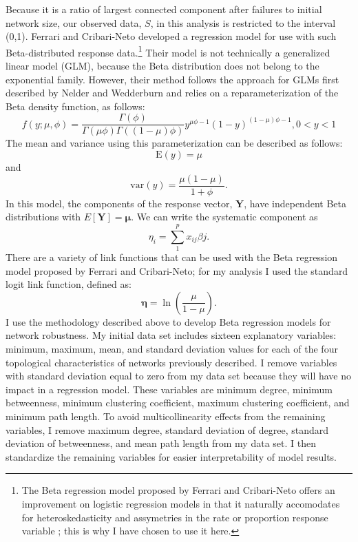 Because it is a ratio of largest connected component after failures to initial network size, our observed data, $S$, in this analysis is restricted to the interval (0,1). Ferrari and Cribari-Neto \cite{Ferrari2004a} developed a regression model for use with such Beta-distributed response data.\footnote[4]{The Beta regression model proposed by Ferrari and Cribari-Neto offers an improvement on logistic regression models in that it naturally accomodates for heteroskedasticity and assymetries in the rate or proportion response variable \cite{Cribari2010}; this is why I have chosen to use it here.} Their model is not technically a generalized linear model (GLM), because the Beta distribution does not belong to the exponential family. However, their method follows the approach for GLMs first described by Nelder and Wedderburn \cite{Nelder1972} and relies on a reparameterization of the Beta density function, as follows:
%
\begin{equation}
f(y;\mu,\phi) = \frac{\Gamma(\phi)}{\Gamma(\mu\phi)\Gamma((1-\mu)\phi)}y^{\mu\phi - 1}(1-y)^{(1-\mu)\phi - 1}, 0<y<1
\end{equation}
%
The mean and variance using this parameterization can be described as follows:
%
\begin{equation}
\text{E}(y) = \mu
\end{equation}
%
and
%
\begin{equation}
\text{var}(y) = \frac{\mu(1-\mu)}{1+\phi}.
\end{equation}
%
In this model, the components of the response vector, $\mathbf{Y}$, have independent Beta distributions with $E[\mathbf{Y}] = \mathbf{\mu}$. We can write the systematic component as 
%
\begin{equation}
\eta_i = \sum\limits_1^p x_{ij}\beta{j}.
\end{equation}
%
There are a variety of link functions that can be used with the Beta regression model proposed by Ferrari and Cribari-Neto; for my analysis I used the standard logit link function, defined as:
%
\begin{equation}
\mathbf{\eta}=\ln\left(\frac{\mu}{1-\mu}\right).
\end{equation}
%
I use the methodology described above to develop Beta regression models for network robustness. My initial data set includes sixteen explanatory variables: minimum, maximum, mean, and standard deviation values for each of the four topological characteristics of networks previously described. I remove variables with standard deviation equal to zero from my data set because they will have no impact in a regression model. These variables are minimum degree, minimum betweenness, minimum clustering coefficient, maximum clustering coefficient, and minimum path length. To avoid multicollinearity effects from the remaining variables, I remove maximum degree, standard deviation of degree, standard deviation of betweenness, and mean path length from my data set. I then standardize the remaining variables for easier interpretability of model results.

